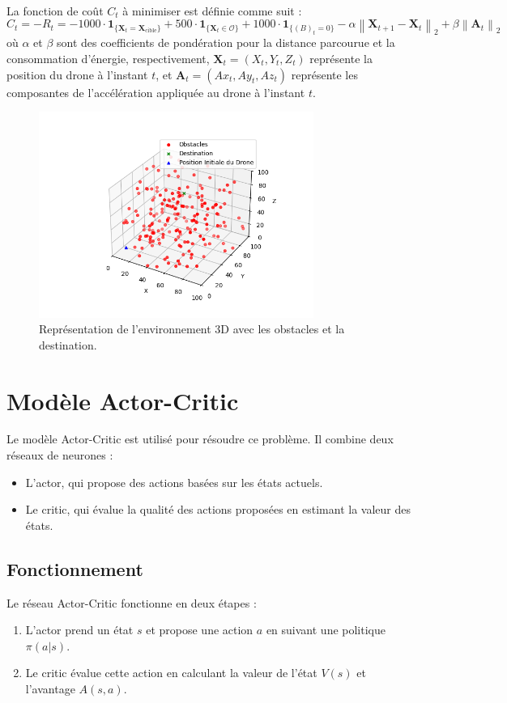 \documentclass[a4paper, 12pt]{article}
\begin{document}
La fonction de coût $C_t$ à minimiser est définie comme suit :
\[
C_t = -R_t = 
-1000 \cdot \mathbf{1}_{\{\mathbf{X}_t = \mathbf{X}_{\text{cible}}\}} + 500 \cdot \mathbf{1}_{\{\mathbf{X}_t \in \mathcal{O}\}} + 1000 \cdot \mathbf{1}_{\{(B)_t = 0\}} - \alpha \left\| \mathbf{X}_{t+1} - \mathbf{X}_t \right\|_2 + \beta \left\| \mathbf{A}_t \right\|_2
\]
où $\alpha$ et $\beta$ sont des coefficients de pondération pour la distance parcourue et la consommation d'énergie, respectivement, $\mathbf{X}_t = (X_t, Y_t, Z_t)$ représente la position du drone à l'instant $t$, et $\mathbf{A}_t = (Ax_t, Ay_t, Az_t)$ représente les composantes de l'accélération appliquée au drone à l'instant $t$.

\begin{figure}[h]
    \centering
    \includegraphics[width=0.8\textwidth]{Figure_1.png}
    \caption{Représentation de l'environnement 3D avec les obstacles et la destination.}
    \label{fig:environment}
\end{figure}

\section{Modèle Actor-Critic}
Le modèle Actor-Critic est utilisé pour résoudre ce problème. Il combine deux réseaux de neurones :
\begin{itemize}
    \item L'actor, qui propose des actions basées sur les états actuels.
    \item Le critic, qui évalue la qualité des actions proposées en estimant la valeur des états.
\end{itemize}

\subsection{Fonctionnement}
Le réseau Actor-Critic fonctionne en deux étapes :
\begin{enumerate}
    \item L'actor prend un état $s$ et propose une action $a$ en suivant une politique $\pi(a|s)$.
    \item Le critic évalue cette action en calculant la valeur de l'état $V(s)$ et l'avantage $A(s, a)$.
\end{enumerate}
\end{document}
